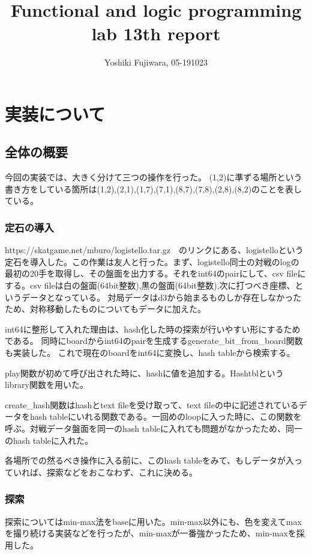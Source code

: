 \documentclass[uplatex,12pt]{jsarticle}
\title {Functional and logic programming lab 13th report}
\date{}
\begin{document}
\author{Yoshiki Fujiwara, 05-191023}
\maketitle

\section{実装について}
\subsection{全体の概要}
今回の実装では、大きく分けて三つの操作を行った。
(1,2)に準ずる場所という書き方をしている箇所は(1,2),(2,1),(1,7),(7,1),(8,7),(7,8),(2,8),(8,2)のことを表している。

\subsubsection{定石の導入}
https://skatgame.net/mburo/logistello.tar.gz　のリンクにある、logistelloという定石を導入した。この作業は友人と行った。まず、logistello同士の対戦のlogの最初の20手を取得し、その盤面を出力する。それをint64のpairにして、csv fileにする。csv fileは白の盤面(64bit整数),黒の盤面(64bit整数),次に打つべき座標、というデータとなっている。
対局データはd3から始まるものしか存在しなかったため、対称移動したものについてもデータに加えた。

int64に整形して入れた理由は、hash化した時の探索が行いやすい形にするためである。
同時にboardからint64のpairを生成するgenerate\_bit\_from\_board関数も実装した。
これで現在のboardをint64に変換し、hash tableから検索する。

play関数が初めて呼び出された時に、hashに値を追加する。Hashtblというlibrary関数を用いた。

create\_hash関数はhashとtext fileを受け取って、text fileの中に記述されているデータをhash tableにいれる関数である。一回めのloopに入った時に、この関数を呼ぶ。対戦データ盤面を同一のhash tableに入れても問題がなかったため、同一のhash tableに入れた。

各場所での然るべき操作に入る前に、このhash tableをみて、もしデータが入っていれば、探索などをおこなわず、これに決める。

\subsubsection{探索}
探索についてはmin-max法をbaseに用いた。min-max以外にも、色を変えてmaxを撮り続ける実装などを行ったが、min-maxが一番強かったため、min-maxを採用した。
\end{document}
